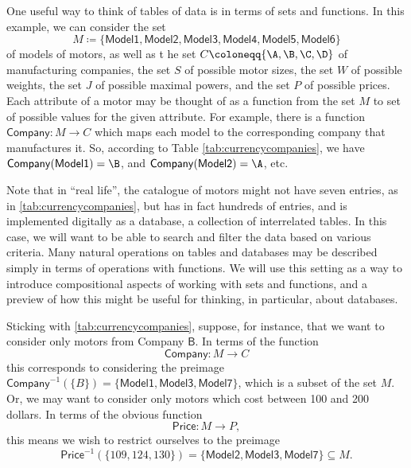 One useful way to think of tables of data is in terms of sets and functions. In this example, we can consider the set
\begin{equation*}
M \coloneqq \{ \mathsf{Model1}, \mathsf{Model2}, \mathsf{Model3}, \mathsf{Model4}, \mathsf{Model5}, \mathsf{Model6} \}
\end{equation*}
of models of motors, as well as t he set $C \coloneqq \{ \A, \B, \C, \D \}$ of manufacturing companies, the set $S$ of possible motor sizes, the set $W$ of possible weights, the set $J$ of possible maximal powers, and the set $P$ of possible prices. Each attribute of a motor may be thought of as a function from the set $M$ to set of possible values for the given attribute. For example, there is a function $\mathsf{Company}: M \longrightarrow C$ which maps each model to the corresponding company that manufactures it. So, according to Table \ref{tab:currencycompanies}, we have  $\mathsf{Company}(\mathsf{Model1}) = \B$, and $\mathsf{Company}(\mathsf{Model2}) = \A$, etc.

Note that in ``real life'', the catalogue of motors might not have seven entries, as in \cref{tab:currencycompanies}, but has in fact hundreds of entries, and is implemented digitally as a database,  a collection of interrelated tables. In this case, we will want to be able to search and filter the data based on various criteria. Many natural operations on tables and databases may be described simply in terms of operations with functions. We will use this setting as a way to introduce compositional aspects of working with sets and functions, and a preview of how this might be useful for thinking, in particular, about databases.

Sticking with \cref{tab:currencycompanies}, suppose, for instance, that we want to consider only motors from Company $\mathsf{B}$. In terms of the function
\begin{equation*}
\mathsf{Company}\colon M \longrightarrow C
\end{equation*}
this corresponds to considering the preimage $\mathsf{Company}^{-1}(\{ B \}) = \{ \mathsf{Model1}, \mathsf{Model3}, \mathsf{Model7} \}$, which is a subset of the set $M$. Or, we may want to consider only motors which cost between 100 and 200 dollars. In terms of the obvious function
\begin{equation*}
\mathsf{Price}\colon M \longrightarrow P,
\end{equation*}
this means we wish to restrict ourselves to the preimage
\begin{equation*}
\mathsf{Price}^{-1}(\{ 109, 124, 130\}) = \{ \mathsf{Model2}, \mathsf{Model3}, \mathsf{Model7} \} \subseteq M.
\end{equation*}

